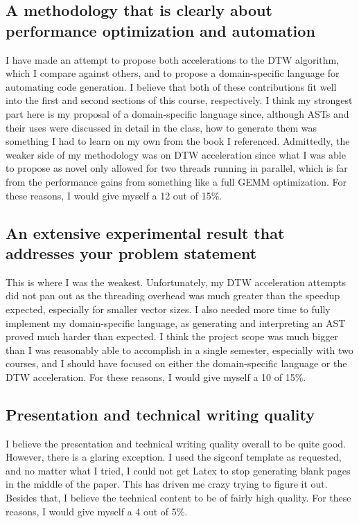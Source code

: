 \documentclass[sigconf,authordraft]{acmart}
\begin{document}
\subsection{A methodology that is clearly about performance optimization and automation}
I have made an attempt to propose both accelerations to the DTW algorithm, which I compare against others, and to propose a domain-specific language for automating code generation. I believe that both of these contributions fit well into the first and second sections of this course, respectively. I think my strongest part here is my proposal of a domain-specific language since, although ASTs and their uses were discussed in detail in the class, how to generate them was something I had to learn on my own from the book I referenced. Admittedly, the weaker side of my methodology was on DTW acceleration since what I was able to propose as novel only allowed for two threads running in parallel, which is far from the performance gains from something like a full GEMM optimization. For these reasons, I would give myself a 12 out of 15\%.

\subsection{An extensive experimental result that addresses your problem statement}
This is where I was the weakest. Unfortunately, my DTW acceleration attempts did not pan out as the threading overhead was much greater than the speedup expected, especially for smaller vector sizes. I also needed more time to fully implement my domain-specific language, as generating and interpreting an AST proved much harder than expected. I think the project scope was much bigger than I was reasonably able to accomplish in a single semester, especially with two courses, and I should have focused on either the domain-specific language or the DTW acceleration. For these reasons, I would give myself a 10 of 15\%.

\subsection{Presentation and technical writing quality}
I believe the presentation and technical writing quality overall to be quite good. However, there is a glaring exception. I used the sigconf template as requested, and no matter what I tried, I could not get Latex to stop generating blank pages in the middle of the paper. This has driven me crazy trying to figure it out. Besides that, I believe the technical content to be of fairly high quality. For these reasons, I would give myself a 4 out of 5\%.
\end{document}
